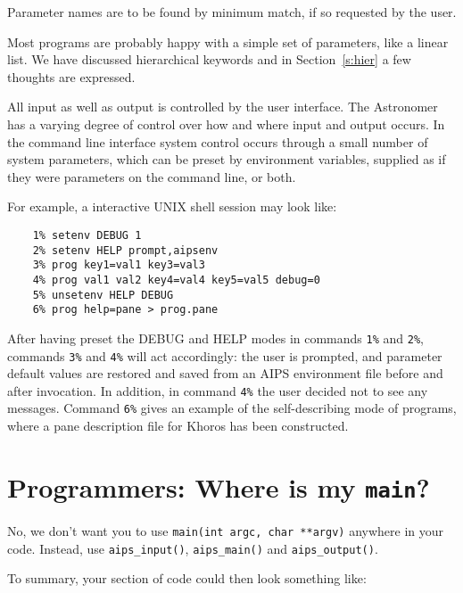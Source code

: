 Parameter names are to be found by minimum match, if so requested
by the user.

Most programs are probably happy with a simple set of parameters,
like a linear list. We have discussed hierarchical keywords
and in Section~\ref{s:hier} a few thoughts are expressed.

All input as well as output is controlled by the user interface. The
Astronomer has a varying degree of control over how and where
input and output occurs. In the command line interface 
system control occurs through a small number of system parameters, which
can be preset by environment variables, supplied as if they were
parameters on the command line, or both.

For example, a interactive UNIX shell session may look like:

\begin{verbatim}
    1% setenv DEBUG 1
    2% setenv HELP prompt,aipsenv
    3% prog key1=val1 key3=val3
    4% prog val1 val2 key4=val4 key5=val5 debug=0
    5% unsetenv HELP DEBUG
    6% prog help=pane > prog.pane
\end{verbatim}

After having preset the DEBUG and HELP modes in commands {\tt 1\%} and
{\tt 2\%}, commands {\tt 3\%} and {\tt 4\%} will act accordingly: the
user is prompted, and parameter default values are restored and saved
from an AIPS environment file before and after invocation.  In addition,
in command {\tt 4\%} the user decided not to see any messages.  Command
{\tt 6\%} gives an example of the self-describing mode of programs,
where a pane description file for Khoros has been constructed. 

\newpage

\section{Programmers: Where is my {\tt main}?}

No, we don't want you to use {\tt main(int argc, char **argv)} anywhere
in your code.  Instead, use {\tt aips\_input()}, {\tt aips\_main()} and
{\tt aips\_output()}. 

\noindent
To summary, your section of code could then look something like:


